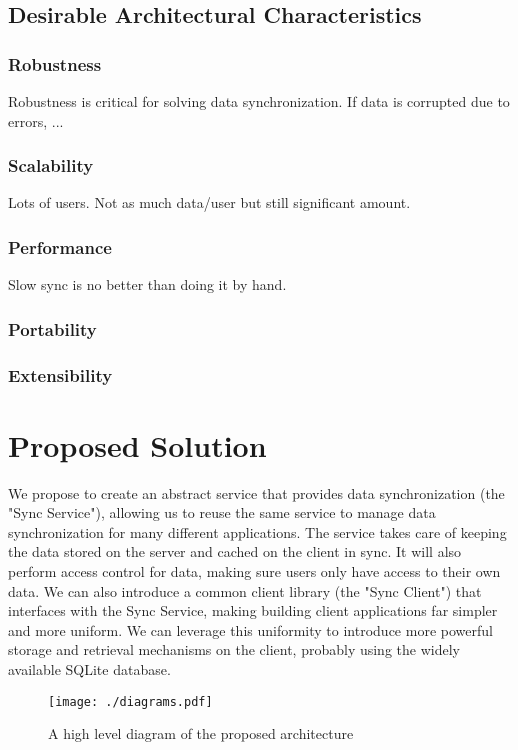 \documentclass[12pt]{article}
\begin{document}
        \subsection{Desirable Architectural Characteristics}
            \subsubsection{Robustness}
            Robustness is critical for solving data synchronization. If data is corrupted due to errors, ...
            \subsubsection{Scalability}
            Lots of users. Not as much data/user but still significant amount.
            \subsubsection{Performance}
            Slow sync is no better than doing it by hand.
            \subsubsection{Portability}
            \subsubsection{Extensibility}

    \section{Proposed Solution}
    We propose to create an abstract service that provides data synchronization (the "Sync Service"), allowing us to reuse the same service to manage data synchronization for many different applications.
    The service takes care of keeping the data stored on the server and cached on the client in sync. It will also perform access control for data, making sure users only have access to their own data.
    We can also introduce a common client library (the "Sync Client") that interfaces with the Sync Service, making building client applications far simpler and more uniform.
    We can leverage this uniformity to introduce more powerful storage and retrieval mechanisms on the client, probably using the widely available SQLite database.

    \begin{figure}[h]
        \centering
        \texttt{[image: ./diagrams.pdf]}
        \caption{A high level diagram of the proposed architecture}
    \end{figure}
\end{document}
